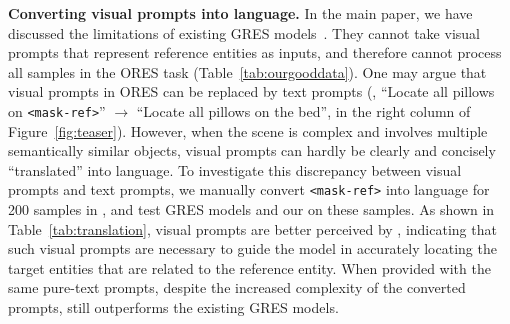 \begin{table}[t!]
    \centering
    \caption{\textbf{Results of finetuning GSVA on our data.} Finetuning GSVA~\cite{xia2024gsva}, the previously best GRES model, on samples of \ourlargedata, does not achieve better ORES performance than the GSVA model trained with its original data recipe. When finetuned on the training samples of \ourgooddata, \ourmodel significantly outperforms GSVA in the ORES task.}
    \label{tab:gsva}
\end{table}

\noindent\textbf{Converting visual prompts into language.} In the main paper, we have discussed the limitations of existing GRES models~\cite{liu2023gres, xia2024gsva, zhang2024psalm}. They cannot take visual prompts that represent reference entities as inputs, and therefore cannot process all samples in the ORES task (Table~\ref{tab:ourgooddata}). One may argue that visual prompts in ORES can be replaced by text prompts (\eg, ``Locate all pillows on \texttt{\textless mask-ref\textgreater}'' $\rightarrow$ ``Locate all pillows on the bed'', in the right column of Figure~\ref{fig:teaser}). However, when the scene is complex and involves multiple semantically similar objects, visual prompts can hardly be clearly and concisely ``translated'' into language. To investigate this discrepancy between visual prompts and text prompts, we manually convert \texttt{\textless mask-ref\textgreater} into language for 200 samples in \ourgooddata, and test GRES models and our \ourmodel on these samples. As shown in Table~\ref{tab:translation}, visual prompts are better perceived by \ourmodel, indicating that such visual prompts are necessary to guide the model in accurately locating the target entities that are related to the reference entity. When provided with the same pure-text prompts, despite the increased complexity of the converted prompts, \ourmodel still outperforms the existing GRES models.

